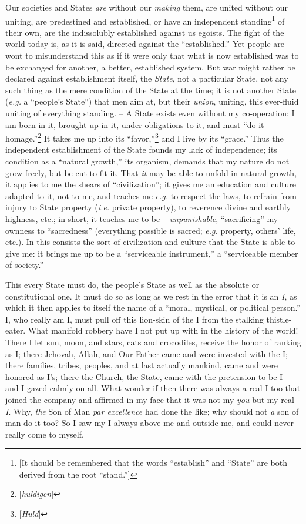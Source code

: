 \documentclass[12pt,a4paper]{book}
\begin{document}
Our societies and States \textit{are} without our \textit{making} them, are 
united without our uniting, are predestined and established, or have an 
independent standing\footnote{[It should be remembered that the words 
``establish'' and ``State'' are both derived from the root ``stand.'']} 
of their own, are the indissolubly established against us egoists. The fight 
of the world today is, as it is said, directed against the ``established.'' 
Yet people are wont to misunderstand this as if it were only that what is now 
established was to be exchanged for another, a better, established system. But 
war might rather be declared against establishment itself, the \textit{State}, 
not a particular State, not any such thing as the mere condition of the State 
at the time; it is not another State (\textit{e.g.} a ``people's State'') 
that men aim at, but their \textit{union}, uniting, this ever-fluid uniting of 
everything standing. -- A State exists even without my co-operation: I am born 
in it, brought up in it, under obligations to it, and must ``do it 
homage.''\footnote{[\textit{huldigen}]} It takes me up into its 
``favor,''\footnote{[\textit{Huld}]} and I live by its ``grace.'' Thus the 
independent establishment of the State founds my lack of independence; its 
condition as a ``natural growth,'' its organism, demands that my nature do 
not grow freely, but be cut to fit it. That \textit{it} may be able to unfold 
in natural growth, it applies to me the shears of ``civilization''; it gives 
me an education and culture adapted to it, not to me, and teaches me 
\textit{e.g.} to respect the laws, to refrain from injury to State property 
(\textit{i.e.} private property), to reverence divine and earthly highness, 
etc.; in short, it teaches me to be -- \textit{unpunishable}, 
``sacrificing'' my ownness to ``sacredness'' (everything possible is 
sacred; \textit{e.g.} property, others' life, etc.). In this consists the 
sort of civilization and culture that the State is able to give me: it brings 
me up to be a ``serviceable instrument,'' a ``serviceable member of 
society.''

This every State must do, the people's State as well as the absolute or 
constitutional one. It must do so as long as we rest in the error that it is 
an \textit{I}, as which it then applies to itself the name of a ``moral, 
mystical, or political person.'' I, who really am I, must pull off this 
lion-skin of the I from the stalking thistle-eater. What manifold robbery have 
I not put up with in the history of the world! There I let sun, moon, and 
stars, cats and crocodiles, receive the honor of ranking as I; there Jehovah, 
Allah, and Our Father came and were invested with the I; there families, 
tribes, peoples, and at last actually mankind, came and were honored as I's; 
there the Church, the State, came with the pretension to be I -- and I gazed 
calmly on all. What wonder if then there was always a real I too that joined 
the company and affirmed in my face that it was not my \textit{you} but my 
real \textit{I}. Why, \textit{the} Son of Man \textit{par excellence} had done 
the like; why should not \textit{a} son of man do it too? So I saw my I always 
above me and outside me, and could never really come to myself.
\end{document}
